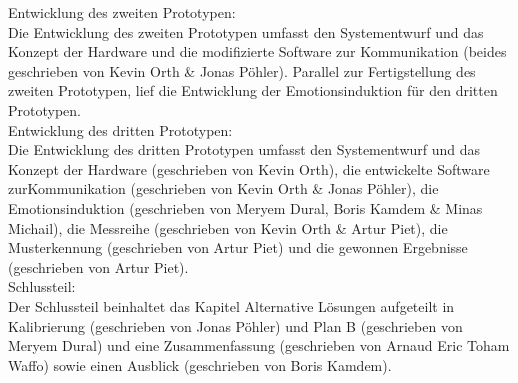 Entwicklung des zweiten Prototypen: \\

Die Entwicklung des zweiten Prototypen umfasst den Systementwurf und das Konzept der Hardware und die modifizierte Software zur Kommunikation (beides  geschrieben von Kevin Orth \& Jonas Pöhler). 
Parallel zur Fertigstellung des zweiten Prototypen, lief die Entwicklung der Emotionsinduktion für den dritten Prototypen. \\

Entwicklung des dritten Prototypen: \\

Die Entwicklung des dritten Prototypen umfasst den Systementwurf und das Konzept der Hardware (geschrieben von Kevin Orth), die entwickelte Software zurKommunikation (geschrieben von Kevin Orth \& Jonas Pöhler), die Emotionsinduktion (geschrieben von Meryem Dural, Boris Kamdem \& Minas Michail), die Messreihe (geschrieben von Kevin Orth \& Artur Piet), die Musterkennung (geschrieben von Artur Piet) und die gewonnen Ergebnisse (geschrieben von Artur Piet). \\

Schlussteil: \\

Der Schlussteil beinhaltet das Kapitel Alternative Lösungen aufgeteilt in Kalibrierung (geschrieben von Jonas Pöhler) und Plan B (geschrieben von Meryem Dural) und eine Zusammenfassung (geschrieben von Arnaud Eric Toham Waffo) sowie einen Ausblick (geschrieben von Boris Kamdem).